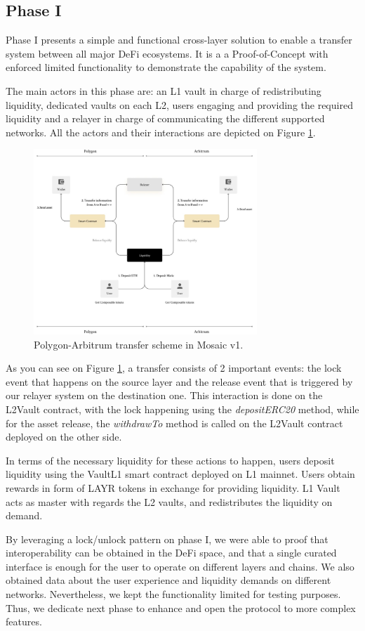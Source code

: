 \subsection{Phase I}

Phase I presents a simple and functional cross-layer solution to enable a transfer system between all major DeFi ecosystems. It is a a Proof-of-Concept with enforced limited functionality to demonstrate the capability of the system.

The main actors in this phase are: an L1 vault in charge of redistributing liquidity, dedicated vaults on each L2, users engaging and providing the required liquidity and a relayer in charge of communicating the different supported networks. All the actors and their interactions are depicted on Figure \ref{fig:v1_mosaic}.

\begin{figure}[h]
    \centering
    \includegraphics[width=0.75\textwidth]{images/mosaic/v1.png}
    \caption{Polygon-Arbitrum transfer scheme in Mosaic v1.}
    \label{fig:v1_mosaic}
\end{figure}

As you can see on Figure \ref{fig:v1_mosaic}, a transfer consists of 2 important events: the lock event that happens on the source layer and the release event that is triggered by our relayer system on the destination one. This interaction is done on the L2Vault contract, with the lock happening using the \textit{depositERC20} method, while for the asset release, the \textit{withdrawTo} method is called on the L2Vault contract deployed on the other side.

In terms of the necessary liquidity for these actions to happen, users deposit liquidity using the VaultL1 smart contract deployed on L1 mainnet. Users obtain rewards in form of LAYR tokens in exchange for providing liquidity. L1 Vault acts as master with regards the L2 vaults, and redistributes the liquidity on demand. 

By leveraging a lock/unlock pattern on phase I, we were able to proof that interoperability can be obtained in the DeFi space, and that a single curated interface is enough for the user to operate on different layers and chains. We also obtained data about the  user experience and liquidity demands on different networks. Nevertheless, we kept the functionality limited for testing purposes. Thus, we dedicate next phase to enhance and open the protocol to more complex features.
